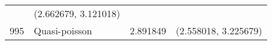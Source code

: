 \documentclass[12pt,]{article}
\begin{document}
\begin{longtable}[]{@{}clcc@{}}
\begin{minipage}[t]{0.21\columnwidth}
\end{minipage} & \begin{minipage}[t]{0.27\columnwidth}\centering\strut
(2.662679, 3.121018)\strut
\end{minipage}\tabularnewline
\begin{minipage}[t]{0.11\columnwidth}\centering\strut
995\strut
\end{minipage} & \begin{minipage}[t]{0.18\columnwidth}\raggedright\strut
Quasi-poisson\strut
\end{minipage} & \begin{minipage}[t]{0.21\columnwidth}\centering\strut
2.891849\strut
\end{minipage} & \begin{minipage}[t]{0.27\columnwidth}\centering\strut
(2.558018, 3.225679)\strut
\end{minipage}\tabularnewline
\bottomrule
\end{longtable}
\end{document}
